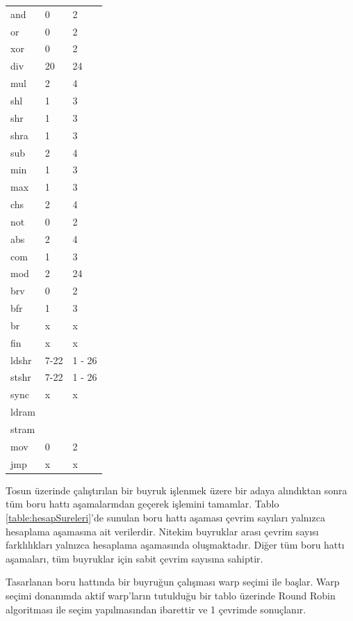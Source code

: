 \begin{longtable}{p{50pt} p{90pt} p{90pt}}
  and 		&	  0 &  2 \\
  or 		  &	  0 &  2 \\
  xor		  &	  0 &  2 \\
  div  		&  20 & 24 \\
  mul  		&   2 &  4 \\
  shl  		&   1 &  3 \\
  shr  		&   1 &  3 \\
  shra  	&   1 &  3 \\
  sub  		&   2 &  4 \\
  min  		&   1 &  3 \\
  max  		&   1 &  3 \\
  chs  		&   2 &  4 \\
  not  		&   0 &  2 \\
  abs  		&   2 &  4 \\
  com  		&   1 &  3 \\
  mod  		&   2 & 24 \\
  brv 		&	  0 &  2 \\
  bfr 		&	  1 &  3 \\
  br 			&	  x &  x \\
  fin 		&	  x &  x \\
  ldshr 	&	 7-22 & 1 - 26 \\
  stshr 	&	 7-22 & 1 - 26 \\
  sync		&	  x  & x \\
  ldram 	&	   &  \\
  stram		&	   &  \\
  mov 		&    0 & 2 \\
  jmp  		&    x & x \\
  
\end{longtable}

Tosun üzerinde çalıştırılan bir buyruk işlenmek üzere bir adaya alındıktan sonra tüm boru hattı aşamalarından geçerek işlemini tamamlar. Tablo \ref{table:hesapSureleri}'de sunulan boru hattı aşaması çevrim sayıları yalnızca hesaplama aşamasına ait verilerdir. Nitekim buyruklar arası çevrim sayısı farklılıkları yalnızca hesaplama aşamasında oluşmaktadır. Diğer tüm boru hattı aşamaları, tüm buyruklar için sabit çevrim sayısına sahiptir.\par

Tasarlanan boru hattında bir buyruğun çalışması warp seçimi ile başlar. Warp seçimi donanımda aktif warp'ların tutulduğu bir tablo üzerinde Round Robin algoritması ile seçim yapılmasından ibarettir ve 1 çevrimde sonuçlanır. \par 


